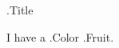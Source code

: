 \documentclass{article}
\begin{document}
\begin{center}
    \large {{.Title}}
\end{center}

I have a {{.Color}} {{.Fruit}}.
\end{document}
